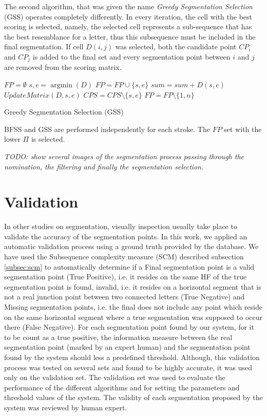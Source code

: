 \documentclass[journal,compsoc]{IEEEtran}
\begin{document}
The second algorithm, that was given the name \emph{Greedy Segmentation Selection} (GSS) operates completely differently. In every iteration, the cell with the best scoring is selected, namely, the selected cell represents a sub-sequence that has the best resemblance for a letter, thus this subsequence must be included in the final segmentation. If cell $D(i,j)$ was selected, both the candidate point $CP_{i}$ and $CP_{j}$ is added to the final set and every segmentation point between $i$ and $j$ are removed from the scoring matrix. 

\begin{algorithm}
$FP=\emptyset$\;
{
	${s,e} = \mathop {\arg \min}(D)$\;
	$FP = FP \cup \{s,e\}$\;
	$sum = sum + D(s,e)$\;
	$UpdateMatrix(D,s,e)$\;
	$CPS = CPS\setminus\{s,e\}$\;
}
$FP=FP\setminus\{1,n\}$\;
\caption{Greedy Segmentation Selection (GSS)}
\label{alg:gss}
\end{algorithm}
BFSS and GSS are performed independently for each stroke. The $FP$ set with the lower $\Pi$ is selected.


\emph{TODO: show several images of the segmentation process passing through the nomination, the filtering and finally the segmentation selection.}

\section{Validation}
\label{sec:validation}
In other studies on segmentation, visually inspection usually take place to validate the accuracy of the segmentation points. In this work, we applied an automatic validation process using a ground truth provided by the database. We have used the Subsequence complexity measure (SCM) described subsection \ref{subsec:scm} to automatically determine if a Final segmentation point is a valid segmentation point (True Positive), i.e. it resides on the same HF of the true segmentation point is found, invalid, i.e. it resides on a horizontal segment that is not a real junction point between two connected letters (True Negative) and Missing segmentation points, i.e. the final does not include any point which reside on the same horizontal segment where a true segmentation was supposed to occur there (False Negative).  
For each segmentation point found by our system, for it to be count as a true positive, the information measure between the real segmentation point (marked by an expert human) and the segmentation point found by the system should less a predefined threshold.
Although, this validation process was tested on several sets and found to be highly accurate, it was used only on the validation set. The validation set was used to evaluate the performance of the different algorithms and for setting the parameters and threshold values of the system. The validity of each segmentation proposed by the system was reviewed by human expert.  
\end{document}
